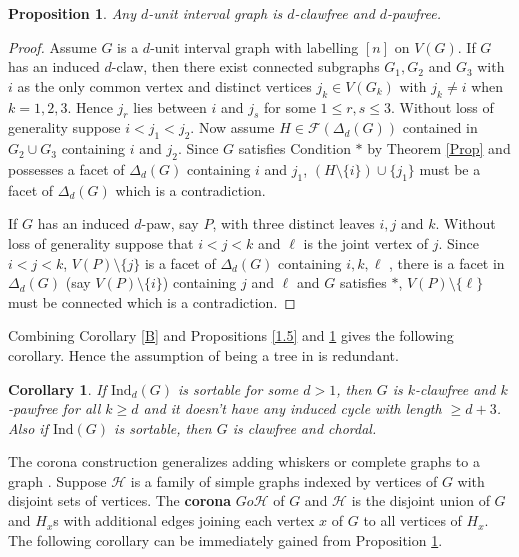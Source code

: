\documentclass[12pt,reqno]{amsart}
\theoremstyle{plain}
\newtheorem{proposition}[theorem]{Proposition}
\newtheorem{corollary}[theorem]{Corollary}
\theoremstyle{definition}
\numberwithin{equation}{section}
\begin{document}
\begin{proposition}\label{1.7}
Any $d$-unit interval graph is $d$-clawfree and $d$-pawfree.
\end{proposition}
\begin{proof}
Assume $G$ is a $d$-unit interval graph with labelling $[n]$ on $V(G)$. If $G$ has an induced $d$-claw, then there exist connected subgraphs  $G_1, G_2$ and $G_3$ with  $i$ as the only common vertex and distinct vertices $j_k\in V(G_k)$ with $j_k\neq i$ when $k=1,2,3$. Hence $j_r$ lies between $i$ and $j_s$ for some $1\leq r,s \leq 3$. Without loss of generality suppose $i< j_1< j_2$. Now assume $H\in \mathcal{F}(\Delta _d(G))$ contained in $G_2\cup G_3$ containing $i$ and $j_2$.  Since $G$ satisfies Condition $*$ by Theorem \ref{Prop} and possesses a facet of $\Delta_d(G)$ containing $i$ and $j_1$,  $(H\setminus \{i\})\cup \{j_1\}$ must be a facet of $\Delta_d(G)$ which is a contradiction.

If $G$ has an induced $d$-paw, say $P$, with three distinct leaves $i, j$ and $k$. Without loss of generality suppose that $i<j<k$ and $\ell$ is the joint vertex of $j$. Since $i<j<k$, $V(P)\setminus \{j\}$ is a facet of $\Delta_d(G)$ containing $i,k, \ell$ , there is a facet in $\Delta_d(G)$ (say $V(P)\setminus \{i\}$) containing $j$ and $\ell$ and $G$ satisfies $*$, $V(P)\setminus \{\ell\}$ must be connected which is a contradiction.
\end{proof}

Combining Corollary \ref{B} and Propositions \ref{1.5} and \ref{1.7} gives the following corollary. 
Hence the assumption of being a tree in \cite[Corollary 9]{Fahimeh} is redundant.

\begin{corollary}\label{2.5}
If $\mathrm{Ind}_d(G)$ is sortable for some $d>1$, then $G$ is $k$-clawfree and $k$-pawfree for all $k\geq d$ and it doesn't have any induced cycle with length $\geq d+3$. Also if $\mathrm{Ind}(G)$ is sortable, then $G$ is clawfree and chordal.
\end{corollary}

The corona construction generalizes adding whiskers or complete graphs to a graph \cite{F+H, V}. Suppose $\mathcal{H}$ is a family of simple graphs indexed by vertices of $G$ with disjoint sets of vertices. The \textbf{corona} $Go\mathcal{H}$ of $G$ and $\mathcal{H}$ is the disjoint union of $G$ and $H_x$s with additional edges joining each vertex $x$ of $G$ to all vertices of $H_x$. The following corollary can be immediately gained from Proposition \ref{1.7}.
\end{document}
